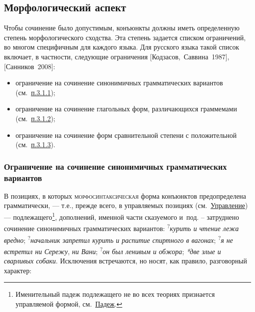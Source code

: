 \subsection{Морфологический
  аспект}\label{ux43cux43eux440ux444ux43eux43bux43eux433ux438ux447ux435ux441ux43aux438ux439-ux430ux441ux43fux435ux43aux442}

Чтобы сочинение было допустимым, конъюнкты должны иметь определенную
степень морфологического сходства. Эта степень задается списком
ограничений, во многом специфичным для каждого языка. Для русского языка
такой список включает, в частности, следующие ограничения
{[}Кодзасов,~Саввина~1987{]}, {[}Санников~2008{]}:

\begin{itemize}
  \item
        ограничение на сочинение синонимичных грамматических вариантов
        (см.~\underline{п.3.1.1});
  \item
        ограничение на сочинение глагольных форм, различающихся граммемами
        (см.~\underline{п.3.1.2});
  \item
        ограничение на сочинение форм сравнительной степени с положительной
        (см.~\underline{п.3.1.3}).
\end{itemize}

\subsubsection{Ограничение на сочинение синонимичных грамматических
  вариантов}\label{ux43eux433ux440ux430ux43dux438ux447ux435ux43dux438ux435-ux43dux430-ux441ux43eux447ux438ux43dux435ux43dux438ux435-ux441ux438ux43dux43eux43dux438ux43cux438ux447ux43dux44bux445-ux433ux440ux430ux43cux43cux430ux442ux438ux447ux435ux441ux43aux438ux445-ux432ux430ux440ux438ux430ux43dux442ux43eux432}

В позициях, в которых \textsc{морфосинтаксическая} форма конъюнктов
предопределена грамматически, --- т.е., прежде всего, в управляемых
позициях (см.~\underline{Управление}) --- подлежащего\footnote{Именительный
  падеж подлежащего не во всех теориях признается управляемой формой,
  см.~\underline{Падеж}.}, дополнений, именной части сказуемого и~под.
-- затруднено сочинение синонимичных грамматических вариантов:
\textsuperscript{?}\textit{курить и чтение лежа вредно};
\textsuperscript{?}\textit{начальник запретил курить и распитие спиртного
  в вагонах}; \textsuperscript{?}\textit{я не встретил ни Сережу}, \textit{ни
  Вани}; \textsuperscript{?}\textit{он был ленивым и обжора}; \textit{*две
  злые и сварливых собаки}. Исключения встречаются, но носят, как правило,
разговорный характер:

